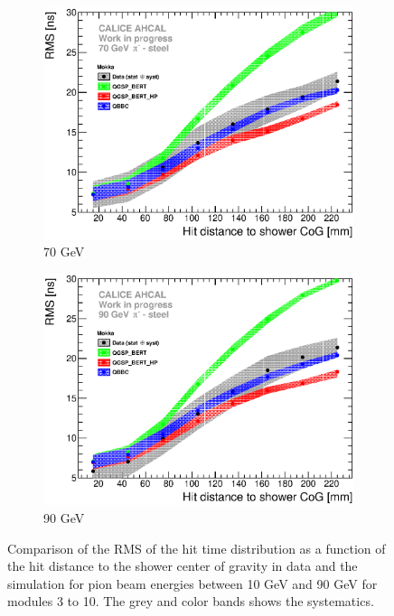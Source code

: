 \begin{figure}[htbp!]
  \begin{subfigure}[t]{0.49\textwidth}
    \centering
    \includegraphics[width=1\textwidth]{../Thesis_Plots/Timing/Pions/Plots/ComparisonToSim/RMS_Radius_70GeV_SSF_Mokka.eps}
    \caption{70 GeV}\label{fig:Radius_SSF_RMS_SimData_70GeV}
  \end{subfigure}
  \hfill
  \begin{subfigure}[t]{0.49\textwidth}
    \centering
    \includegraphics[width=1\textwidth]{../Thesis_Plots/Timing/Pions/Plots/ComparisonToSim/RMS_Radius_90GeV_SSF_Mokka.eps}
    \caption{90 GeV}\label{fig:Radius_SSF_RMS_SimData_90GeV}
  \end{subfigure}
  \caption{Comparison of the RMS of the hit time distribution as a function of the hit distance to the shower center of gravity in data and the \mokka simulation for pion beam energies between 10 GeV and 90 GeV for modules 3 to 10. The grey and color bands shows the systematics.}
  \label{fig:Radius_SSF_RMS_SimData_Comparison_Mokka}
\end{figure}

